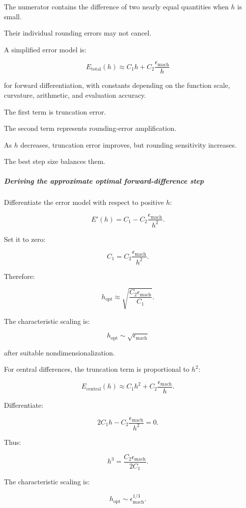 The numerator contains the difference of two nearly equal quantities when \(h\) is small.

Their individual rounding errors may not cancel.

A simplified error model is:

\[
\boxed{ E_{\mathrm{total}}(h) \approx C_1h+C_2\frac{\epsilon_{\mathrm{mach}}}{h} }
\]

for forward differentiation, with constants depending on the function scale, curvature, arithmetic, and evaluation accuracy.

The first term is truncation error.

The second term represents rounding-error amplification.

As \(h\) decreases, truncation error improves, but rounding sensitivity increases.

The best step size balances them.

\subparagraph{Deriving the approximate optimal forward-difference step}\label{02-foundations-ii-ch025-deriving-the-approximate-optimal-forward-difference-step}

Differentiate the error model with respect to positive \(h\):

\[
E'(h)= C_1- C_2\frac{\epsilon_{\mathrm{mach}}}{h^2}.
\]

Set it to zero:

\[
C_1= C_2\frac{\epsilon_{\mathrm{mach}}}{h^2}.
\]

Therefore:

\[
\boxed{ h_{\mathrm{opt}} \approx \sqrt{\frac{C_2\epsilon_{\mathrm{mach}}}{C_1}} }.
\]

The characteristic scaling is:

\[
h_{\mathrm{opt}}\sim\sqrt{\epsilon_{\mathrm{mach}}}
\]

after suitable nondimensionalization.

For central differences, the truncation term is proportional to \(h^2\):

\[
E_{\mathrm{central}}(h) \approx C_1h^2+ C_2\frac{\epsilon_{\mathrm{mach}}}{h}.
\]

Differentiate:

\[
2C_1h- C_2\frac{\epsilon_{\mathrm{mach}}}{h^2}=0.
\]

Thus:

\[
h^3= \frac{C_2\epsilon_{\mathrm{mach}}}{2C_1}.
\]

The characteristic scaling is:

\[
\boxed{ h_{\mathrm{opt}}\sim \epsilon_{\mathrm{mach}}^{1/3} }.
\]

